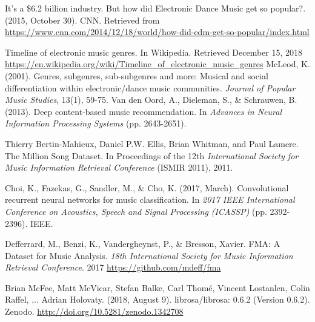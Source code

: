 \documentclass[12pt]{article}
\newcounter{ct}
\begin{document}
\begin{thebibliography}{99}
{
    
    It's a \$6.2 billion industry. But how did 
    Electronic Dance Music get so popular?. (2015, October 30). CNN. 
    Retrieved from 
    \href {https://www.cnn.com/2014/12/18/world/how-did-edm-get-so-popular/index.html}
    {https://www.cnn.com/2014/12/18/world/how-did-edm-get-so-popular/index.html}
}
{   
    Timeline of electronic music genres.
    In Wikipedia. Retrieved December 15, 2018
    \href{https://en.wikipedia.org/wiki/Timeline_of_electronic_music_genres}
    {https://en.wikipedia.org/wiki/Timeline\_of\_electronic\_music\_genres}
}
{
    McLeod, K. (2001).
    Genres, subgenres, sub-subgenres and more:
    Musical and social differentiation within electronic/dance 
    music communities. 
    \textit{Journal of Popular Music Studies}, 13(1), 59-75.
}
{
    Van den Oord, A., Dieleman, S., \& Schrauwen, B. (2013). 
    Deep content-based music recommendation. 
    In \textit{Advances in Neural Information Processing Systems} 
    (pp. 2643-2651).
}
{
    Thierry Bertin-Mahieux, Daniel P.W. Ellis, Brian Whitman, and Paul Lamere. 
    The Million Song Dataset. In Proceedings of the 12th \textit
    {International Society
    for Music Information Retrieval Conference} (ISMIR 2011), 2011.

}
{
    Choi, K., Fazekas, G., Sandler, M., \& Cho, K. (2017, March). 
    Convolutional recurrent neural networks for music classification. 
    In \textit{2017 IEEE International Conference on Acoustics, Speech 
    and Signal 
    Processing (ICASSP)} (pp. 2392-2396). IEEE.
}
{
  
  Defferrard, M., Benzi, K., Vandergheynst, P., \& Bresson, Xavier.
  FMA: A Dataset for Music Analysis.
  \textit{18th International Society for Music Information 
  Retrieval Conference}.
  2017
  \href{https://github.com/mdeff/fma}
  {https://github.com/mdeff/fma}
}

{
    Brian McFee, Matt McVicar, Stefan Balke, Carl Thomé, 
    Vincent Lostanlen, Colin Raffel, ... Adrian Holovaty. 
    (2018, August 9). librosa/librosa: 0.6.2 (Version 0.6.2). 
    Zenodo. 
    \href{http://doi.org/10.5281/zenodo.1342708}
    {http://doi.org/10.5281/zenodo.1342708}
    
}
\end{thebibliography}
\end{document}
